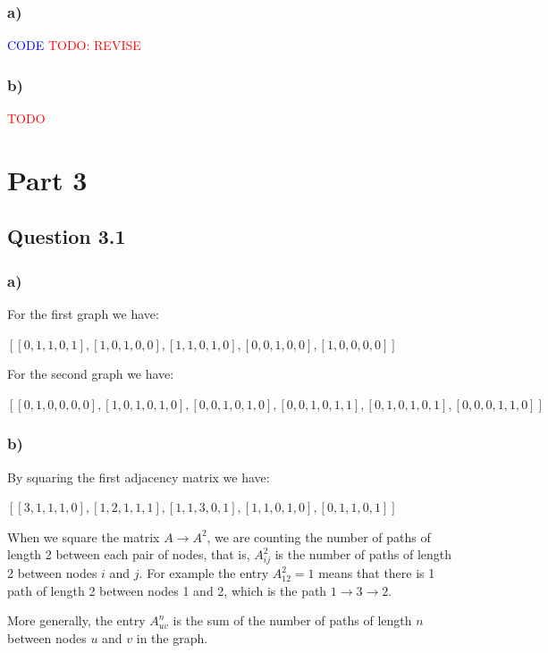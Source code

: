 \documentclass{article}
\begin{document}
\subsubsection*{a)}

\textcolor{blue}{CODE}
\textcolor{red}{TODO: REVISE}

\subsubsection*{b)}
\textcolor{red}{TODO}

\newpage

\section*{Part 3}

\subsection*{Question 3.1}

\subsubsection*{a)}

For the first graph we have:

$[
[0, 1, 1, 0, 1],
[1, 0, 1, 0, 0],
[1, 1, 0, 1, 0],
[0, 0, 1, 0, 0],
[1, 0, 0, 0, 0]]$

For the second graph we have:

$[
[0, 1, 0, 0, 0, 0],
[1, 0, 1, 0, 1, 0],
[0, 0, 1, 0, 1, 0],
[0, 0, 1, 0, 1, 1],
[0, 1, 0, 1, 0, 1], 
[0, 0, 0, 1, 1, 0]]$

\subsubsection*{b)}

By squaring the first adjacency matrix we have:

$[
[3, 1, 1, 1, 0],
[1, 2, 1, 1, 1],
[1, 1, 3, 0, 1],
[1, 1, 0, 1, 0],
[0, 1, 1, 0, 1]]$

When we square the matrix $A \rightarrow A^2$, we are counting the number of paths of length 2 between each pair of nodes,
that is, $A_{ij}^2$ is the number of paths of length 2 between nodes $i$ and $j$.
For example the entry $A_{12}^2 = 1$ means that there is 1 path of length 2 between nodes 1 and 2, which is the path
$1 \rightarrow 3 \rightarrow 2$.

More generally, the entry $A_{uv}^n$ is the sum of the number of paths of length $n$ between nodes $u$ and $v$ in the graph.
\end{document}
